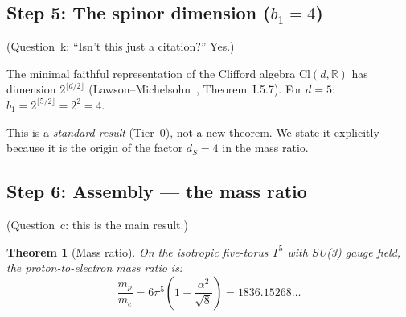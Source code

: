 \documentclass[11pt,a4paper]{article}
\newtheorem{theorem}{Theorem}
\theoremstyle{definition}
\theoremstyle{remark}
\begin{document}
\subsection{Step 5: The spinor dimension ($b_1 = 4$)}
\label{app:step5}

(Question~k: ``Isn't this just a citation?''  Yes.)

The minimal faithful representation of the Clifford algebra
$\mathrm{Cl}(d, \mathbb{R})$ has dimension $2^{\lfloor d/2 \rfloor}$
(Lawson--Michelsohn~\cite{LawsonMichelsohn1989}, Theorem~I.5.7).
For $d = 5$: $b_1 = 2^{\lfloor 5/2 \rfloor} = 2^2 = 4$.

This is a \emph{standard result} (Tier~0), not a new theorem.
We state it explicitly because it is the origin of the
factor $d_S = 4$ in the mass ratio.

\subsection{Step 6: Assembly --- the mass ratio}
\label{app:step6}

(Question~c: this is the main result.)

\begin{theorem}[Mass ratio]\label{thm:massratio_app}
On the isotropic five-torus $T^5$ with SU(3) gauge field,
the proton-to-electron mass ratio is:
\begin{equation}
  \boxed{\frac{m_p}{m_e} = 6\pi^5\!\left(1 + \frac{\alpha^2}{\sqrt{8}}\right)
  = 1836.15268\ldots}
\end{equation}
\end{theorem}
\end{document}
